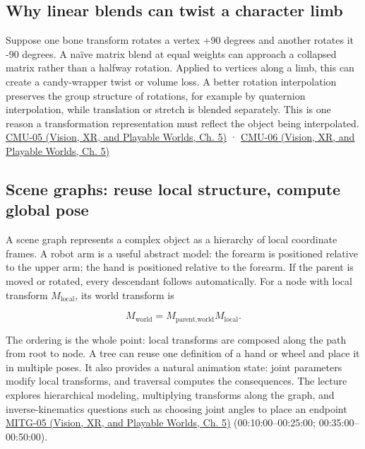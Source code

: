 \subsection{Why linear blends can twist a character limb}\label{04-visual-computing-ii-ch029-why-linear-blends-can-twist-a-character-limb}

\hypertarget{04-visual-computing-ii-ch029-why-linear-blends-can-twist-a-character-limb}{}

Suppose one bone transform rotates a vertex +90 degrees and another rotates it -90 degrees. A naïve matrix blend at equal weights can approach a collapsed matrix rather than a halfway rotation. Applied to vertices along a limb, this can create a candy-wrapper twist or volume loss. A better rotation interpolation preserves the group structure of rotations, for example by quaternion interpolation, while translation or stretch is blended separately. This is one reason a transformation representation must reflect the object being interpolated. \href{../07-Vision-XR-and-Playable-Worlds/main.pdf\#nameddest=04-visual-computing-ii-ch036-cmu-05---spatial-transformations}{CMU-05 (Vision, XR, and Playable Worlds, Ch. 5)} · \href{../07-Vision-XR-and-Playable-Worlds/main.pdf\#nameddest=04-visual-computing-ii-ch036-cmu-06---3d-rotations-and-complex-representations}{CMU-06 (Vision, XR, and Playable Worlds, Ch. 5)}

\subsection{Scene graphs: reuse local structure, compute global pose}\label{04-visual-computing-ii-ch029-scene-graphs-reuse-local-structure-compute-global-pose}

\hypertarget{04-visual-computing-ii-ch029-scene-graphs-reuse-local-structure-compute-global-pose}{}

A scene graph represents a complex object as a hierarchy of local coordinate frames. A robot arm is a useful abstract model: the forearm is positioned relative to the upper arm; the hand is positioned relative to the forearm. If the parent is moved or rotated, every descendant follows automatically. For a node with local transform \(M_{\mathrm{local}}\), its world transform is

\[
M_{\text{world}}=M_{\text{parent,world}}M_{\text{local}}.
\]

The ordering is the whole point: local transforms are composed along the path from root to node. A tree can reuse one definition of a hand or wheel and place it in multiple poses. It also provides a natural animation state: joint parameters modify local transforms, and traversal computes the consequences. The lecture explores hierarchical modeling, multiplying transforms along the graph, and inverse-kinematics questions such as choosing joint angles to place an endpoint \href{../07-Vision-XR-and-Playable-Worlds/main.pdf\#nameddest=04-visual-computing-ii-ch036-mitg-05---hierarchical-modeling}{MITG-05 (Vision, XR, and Playable Worlds, Ch. 5)} (00:10:00--00:25:00; 00:35:00--00:50:00).

